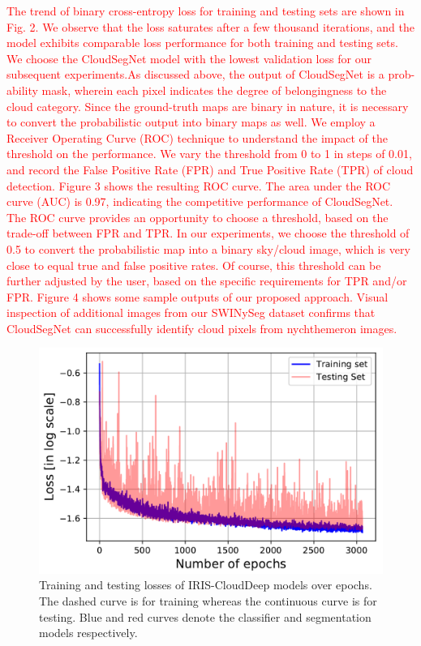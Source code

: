 \documentclass[amt, article]{copernicus}
\begin{document}
\textcolor{red}{The trend of binary cross-entropy loss for training and testing sets are shown in Fig. 2. We observe that the loss saturates after
a few thousand iterations, and the model exhibits comparable
loss performance for both training and testing sets. We choose
the CloudSegNet model with the lowest validation loss for our
subsequent experiments.As discussed above, the output of CloudSegNet is a prob-ability mask, wherein each pixel indicates the degree of belongingness to the cloud category. Since the ground-truth maps are binary in nature, it is necessary to convert the probabilistic output into binary maps as well. We employ a Receiver Operating Curve (ROC) technique to understand the impact of the threshold on the performance. We vary the threshold from 0 to 1 in steps of 0.01, and record the False Positive Rate (FPR) and True Positive Rate (TPR) of cloud detection. Figure 3 shows the resulting ROC curve. The area under the ROC curve (AUC) is 0.97, indicating the competitive performance of CloudSegNet. The ROC curve provides an opportunity to choose a threshold, based on the trade-off between FPR and TPR. In our experiments, we choose the threshold of 0.5 to convert the probabilistic map into a binary sky/cloud image, which is very close to equal true and false positive rates. Of course, this threshold can be further adjusted by the user, based on the specific requirements for TPR and/or FPR. Figure 4 shows some sample outputs of our proposed approach. Visual inspection of additional images from our SWINySeg dataset confirms that CloudSegNet can successfully identify cloud pixels from nychthemeron images.}

\begin{figure}[t]
	\includegraphics[width=\hsize]{figures/loss_trend.png}
	\caption{Training and testing losses of IRIS-CloudDeep models over
    epochs. The dashed curve is for training whereas the continuous curve is for testing. Blue and red curves denote the classifier and segmentation models respectively.}
    \label{fig:loss_trend}
\end{figure}
\end{document}

